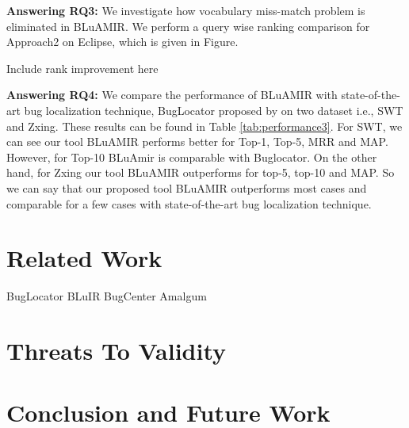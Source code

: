 \documentclass[conference]{IEEEtran}
\begin{document}
\textbf{Answering RQ3:}
We investigate how vocabulary miss-match problem is eliminated in BLuAMIR. We perform a query wise ranking comparison for Approach2 on Eclipse, which is given in Figure. 

Include rank improvement here

\textbf{Answering RQ4:}
We compare the performance of BLuAMIR with state-of-the-art bug localization technique, BugLocator proposed by \citet{Jian} on two dataset i.e., SWT and Zxing. These results can be found in Table \ref{tab:performance3}. For SWT, we can see our tool BLuAMIR performs better for Top-1, Top-5, MRR and MAP. However, for Top-10 BLuAmir is comparable with Buglocator. On the other hand, for Zxing our tool BLuAMIR outperforms for top-5, top-10 and MAP. So we can say that our proposed tool BLuAMIR outperforms most cases and comparable for a few cases with state-of-the-art bug localization technique.
\section{Related Work}
BugLocator
BLuIR
BugCenter
Amalgum
\section{Threats To Validity}\label{sec:threats}


\section{Conclusion and Future Work}\label{summary}




\scriptsize

\end{document}
